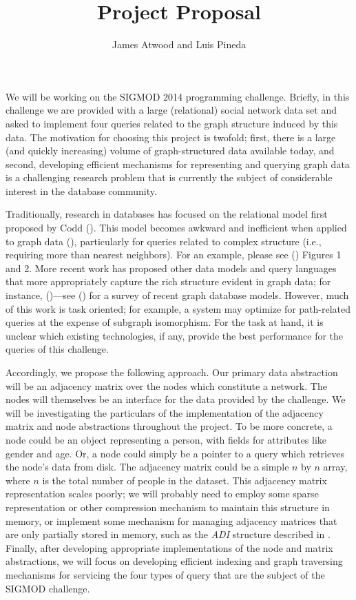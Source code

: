 \documentclass{article}
\title{Project Proposal}
\author{
James Atwood and Luis Pineda \\ %
}
\begin{document}
\maketitle

We will be working on the SIGMOD 2014 programming challenge.  Briefly, in this challenge we are provided with a large (relational) social network data set and asked to implement four queries related to the graph structure induced by this data.  The motivation for choosing this project is twofold; first, there is a large (and quickly increasing) volume of graph-structured data available today, and second, developing efficient mechanisms for representing and querying graph data is a challenging research problem that is currently the subject of considerable interest in the database community.

Traditionally, research in databases has focused on the relational model first proposed by Codd  (\cite{codd1970relational}).  This model becomes awkward and inefficient when applied to graph data (\cite{rodriguez2011graph}), particularly for queries related to complex structure (i.e., requiring more than nearest neighbors).  For an example, please see (\cite{he2008graphs}) Figures 1 and 2.  More recent work has proposed other data models and query languages that more appropriately capture the rich structure evident in graph data; for instance, (\cite{he2008graphs,sun2012efficient,low2010graphlab})---see (\cite{angles2008survey}) for a survey of recent graph database models.  However, much of this work is task oriented; for example, a system may optimize for path-related queries at the expense of subgraph isomorphism.  For the task at hand, it is unclear which existing technologies, if any, provide the best performance for the queries of this challenge.

Accordingly, we propose the following approach.  Our primary data abstraction will be an adjacency matrix over the nodes which constitute a network.  The nodes will themselves be an interface for the data provided by the challenge.  We will be investigating the particulars of the implementation of the adjacency matrix and node abstractions throughout the project. To be more concrete, a node could be an object representing a person, with fields for attributes like gender and age.  Or, a node could simply be a pointer to a query which retrieves the node's data from disk.  The adjacency matrix could be a simple $n$ by $n$ array, where $n$ is the total number of people in the dataset.  This adjacency matrix representation scales poorly; we will probably need to employ some sparse representation or other compression mechanism to maintain this structure in memory, or implement some mechanism for managing adjacency matrices that are only partially stored in memory, such as the \emph{ADI} structure described in \cite{wang2004scalable}. Finally, after developing appropriate  implementations of the node and matrix abstractions, we will focus on developing efficient indexing and graph traversing mechanisms for servicing the four types of query that are the subject of the SIGMOD challenge.
\end{document}
